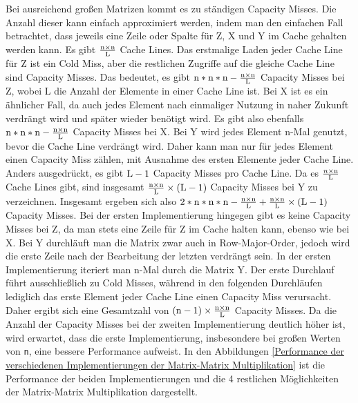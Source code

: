 \documentclass[sigconf,language=ngerman]{acmart}
\begin{document}
Bei ausreichend großen Matrizen kommt es zu ständigen Capacity Misses. 
Die Anzahl dieser kann einfach approximiert werden, 
indem man den einfachen Fall betrachtet, 
dass jeweils eine Zeile oder Spalte für Z, X und Y im Cache gehalten werden kann.
Es gibt $ \frac{\textnormal{n} \times \textnormal{n}}{\textnormal{L}} $ Cache Lines. 
Das erstmalige Laden jeder Cache Line für Z ist ein Cold Miss, 
aber die restlichen Zugriffe auf die gleiche Cache Line sind Capacity Misses. 
Das bedeutet, es gibt $\textnormal{n} * \textnormal{n} * \textnormal{n} - \frac{\textnormal{n} \times \textnormal{n}}{\textnormal{L}} $ 
Capacity Misses bei Z, wobei L die Anzahl der Elemente 
in einer Cache Line ist.
Bei X ist es ein ähnlicher Fall, da auch jedes Element nach einmaliger Nutzung in naher Zukunft verdrängt wird 
und später wieder benötigt wird. 
Es gibt also ebenfalls 
$\textnormal{n} * \textnormal{n} * \textnormal{n} - \frac{\textnormal{n} \times \textnormal{n}}{\textnormal{L}} $ 
Capacity Misses bei X.
Bei Y wird jedes Element n-Mal genutzt, bevor die Cache Line verdrängt wird. 
Daher kann man nur für jedes Element einen Capacity Miss zählen, 
mit Ausnahme des ersten Elemente jeder Cache Line. Anders ausgedrückt, 
es gibt $\textnormal{L} - 1 $ Capacity Misses pro Cache Line. 
Da es $ \frac{n \times \textnormal{n}}{\textnormal{L}} $ Cache Lines gibt, 
sind insgesamt $ \frac{\textnormal{n} \times \textnormal{n}}{\textnormal{L}} \times (\textnormal{L} - 1) $ Capacity Misses bei Y zu verzeichnen.
Insgesamt ergeben sich also 
$2 * \textnormal{n} * \textnormal{n} * \textnormal{n} - \frac{\textnormal{n} \times \textnormal{n}}{\textnormal{L}} + \frac{\textnormal{n} \times \textnormal{n}}{\textnormal{L}} \times (\textnormal{L} - 1) $ Capacity Misses.
Bei der ersten Implementierung hingegen gibt es keine Capacity Misses bei Z, 
da man stets eine Zeile für Z im Cache halten kann, ebenso wie bei X. 
Bei Y durchläuft man die Matrix zwar auch in Row-Major-Order, 
jedoch wird die erste Zeile nach der Bearbeitung der letzten verdrängt sein.
In der ersten Implementierung iteriert man n-Mal durch die Matrix Y. 
Der erste Durchlauf führt ausschließlich zu Cold Misses, 
während in den folgenden Durchläufen lediglich das erste Element jeder Cache Line einen Capacity Miss verursacht. 
Daher ergibt sich eine Gesamtzahl von $(\textnormal{n}-1) \times \frac{\textnormal{n} \times \textnormal{n}}{\textnormal{L}} $ Capacity Misses. 
Da die Anzahl der Capacity Misses bei der zweiten Implementierung deutlich höher ist, 
wird erwartet, dass die erste Implementierung, 
insbesondere bei großen Werten von \texttt{n}, eine bessere Performance aufweist.
In den Abbildungen \ref{Performance der verschiedenen Implementierungen der Matrix-Matrix Multiplikation} ist die Performance der beiden Implementierungen und die 4 restlichen 
Möglichkeiten der Matrix-Matrix Multiplikation dargestellt.\\\\ %
\end{document}
